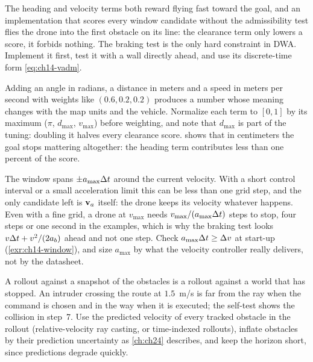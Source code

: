 \begin{pitfall}
The heading and velocity terms both reward flying fast toward the goal, and
an implementation that scores every window candidate without the
admissibility test flies the drone into the first obstacle on its line: the
clearance term only lowers a score, it forbids nothing. The braking test is
the only hard constraint in DWA. Implement it first, test it with a wall
directly ahead, and use its discrete-time form \cref{eq:ch14-vadm}.
\end{pitfall}

\begin{pitfall}
Adding an angle in radians, a distance in meters and a speed in meters per
second with weights like $(0.6, 0.2, 0.2)$ produces a number whose meaning
changes with the map units and the vehicle. Normalize each term to $[0, 1]$
by its maximum ($\pi$, $d_{\max}$, $v_{\max}$) before weighting, and note
that $d_{\max}$ is part of the tuning: doubling it halves every clearance
score.  shows that in centimeters the goal stops mattering
altogether: the heading term contributes less than one percent of the score.
\end{pitfall}

\begin{pitfall}
The window spans $\pm a_{\max}\Delta t$ around the current velocity. With a short
control interval or a small acceleration limit this can be less than one grid
step, and the only candidate left is $\mathbf{v}_a$ itself: the drone keeps its
velocity whatever happens. Even with a fine grid, a drone at $v_{\max}$ needs
$v_{\max}/(a_{\max}\Delta t)$ steps to stop, four steps or one second in the
examples, which is why the braking test looks $v\Delta t + v^2/(2a_b)$ ahead and
not one step. Check $a_{\max}\Delta t \ge \Delta v$ at start-up (\cref{exr:ch14-window}), and size
$a_{\max}$ by what the velocity controller really delivers, not by the
datasheet.
\end{pitfall}

\begin{pitfall}
A rollout against a snapshot of the obstacles is a rollout against a world
that has stopped. An intruder crossing the route at $1.5$~m/s is far from
the ray when the command is chosen and in the way when it is executed; the
self-test shows the collision in step~7. Use the predicted velocity of every
tracked obstacle in the rollout (relative-velocity ray casting, or
time-indexed rollouts), inflate obstacles by their prediction uncertainty as
\cref{ch:ch24} describes, and keep the horizon short, since predictions
degrade quickly.
\end{pitfall}

